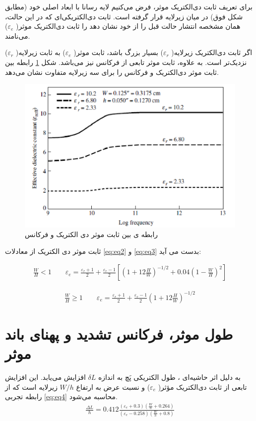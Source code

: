 برای تعریف ثابت دی‌الکتریک موثر، فرض می‌کنیم لایه رسانا با ابعاد اصلی خود (مطابق شکل فوق) در میان زیرلایه قرار گرفته است. ثابت دی‌الکتریکی‌ای که در این حالت، همان مشخصه انتشار حالت قبل را از خود نشان دهد را ثابت دی‌الکتریک موثر(
$\varepsilon_{e}$)
می‌نامند.


اگر ثابت دی‌الکتریک زیرلایه(
$\varepsilon_r$)
بسیار بزرگ باشد، ثابت موثر(
$\varepsilon_{e}$)
به ثابت زیرلایه(
$\varepsilon_{r}$)
نزدیک‌تر است. به علاوه، ثابت موثر تابعی از فرکانس نیز می‌باشد. شکل 
\ref{fig9}
 رابطه بین ثابت موثر دی‌الکتریک و فرکانس را برای سه زیرلایه متفاوت نشان می‌دهد.

\begin{figure}
	\centering
	\includegraphics[scale=0.3]{Images/fig9.png}
	\caption{رابطه ی بین ثابت موثر دی الکتریک و فرکانس}
	\label{fig9}
\end{figure}

ثابت موثر دی الکتریک از معادلات 
\ref{eq:eq2}
و
\ref{eq:eq3}
بدست می آید:

\begin{align}
 	\label{eq:eq2}
    \frac{W}{H} < 1	\qquad  \varepsilon_e = \frac{\varepsilon_r+1}{2} + \frac{\varepsilon_r-1}{2} \left[ \left(1+12\frac{H}{W}\right)^{-1/2} + 0.04 \left(1-\frac{W}{H}\right)^2 \right]
\end{align}


\begin{align}
	\label{eq:eq3}
    \frac{W}{H} \geq 1 \qquad \varepsilon_e = \frac{\varepsilon_r+1}{2} + \frac{\varepsilon_r-1}{2} \left(1+12\frac{H}{W}\right)^{-1/2} 
\end{align}


\section{طول موثر، فرکانس تشدید و پهنای باند موثر}
به دلیل اثر حاشیه‌ای
،
 طول الکتریکی پَچ به اندازه
$ \delta L$
 افزایش می‌یابد. این افزایش تابعی از ثابت دی‌الکتریک مؤثر(
 $\varepsilon_{e}$)
 و نسبت عرض به ارتفاع
 $W/h$
  زیرلایه است که از رابطه تجربی 
\eqref{eq:eq4}
   محاسبه می‌شود.
\begin{align}
	\label{eq:eq4}
	\frac{\Delta L}{h} = 0.412 \frac{(\varepsilon_{e}+0.3)\left(\frac{W}{h}+0.264\right)}{(\varepsilon_{e}-0.258)\left(\frac{W}{h}+0.8\right)}
\end{align}


